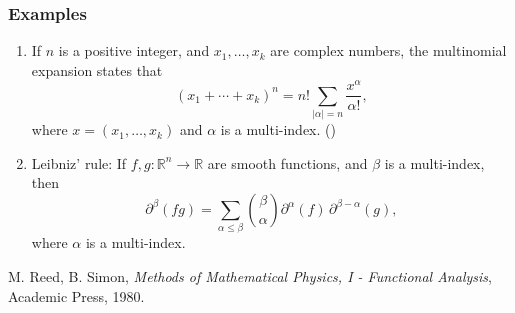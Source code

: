 \documentclass[12pt]{article}
\newcommand{\sR}[0]{\mathbb{R}}
\begin{document}
\subsubsection*{Examples}
\begin{enumerate}
\item If $n$ is a positive integer, and $x_1,\ldots, x_k$ are
complex numbers, the multinomial expansion  states that
$$ 
  (x_1+\cdots + x_k)^n = n! \sum_{|\alpha|=n} \frac{x^\alpha}{\alpha!}, 
$$
where $x=(x_1,\ldots, x_k)$ and $\alpha$ is a multi-index.
()
\item Leibniz' rule: If $f,g\colon\sR^n \to \sR$ are smooth functions, and $\beta$ is
a multi-index, then 
$$ \partial^\beta(fg) = \sum_{\alpha\le \beta} {\beta \choose \alpha} \partial^\alpha(f)\, \partial^{\beta-\alpha}(g),$$
where $\alpha$ is a multi-index.
\end{enumerate}

\begin{thebibliography}{9}
 M. Reed, B. Simon, \emph{Methods of Mathematical Physics,
I - Functional Analysis}, Academic Press, 1980.
\end{thebibliography}
\end{document}

